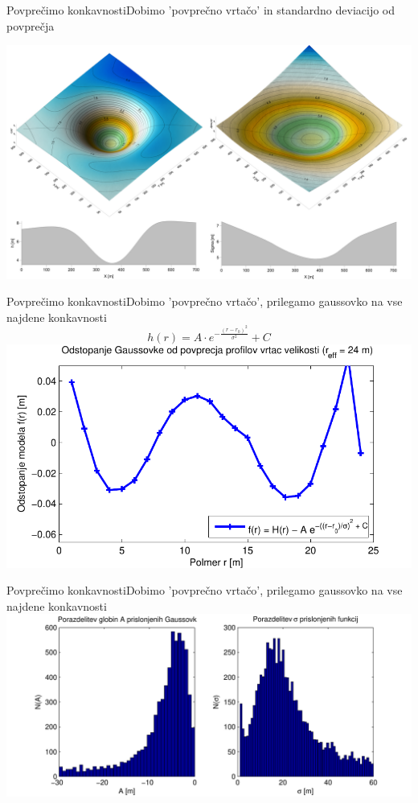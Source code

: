 \documentclass{beamer}
\begin{document}
\begin{frame}{Povprečimo konkavnosti}{Dobimo 'povprečno vrtačo' in standardno deviacijo od povprečja}

    \includegraphics[width=\textwidth]{slike/menisija-vrtaca-sigma}
\end{frame}

\begin{frame}{Povprečimo konkavnosti}{Dobimo 'povprečno vrtačo', prilegamo gaussovko na vse najdene konkavnosti}
    \begin{equation} h(r) = A \cdot e^{-\frac{(r-r_0)^2}{\sigma^2}} + C \end{equation}
    \includegraphics[width=\textwidth]{slike/menisija-profil-21-fit}
\end{frame}

\begin{frame}{Povprečimo konkavnosti}{Dobimo 'povprečno vrtačo', prilegamo gaussovko na vse najdene konkavnosti}
    \includegraphics[width=\textwidth]{slike/menisija-visine-in-sigme-hist}
\end{frame}
\end{document}

